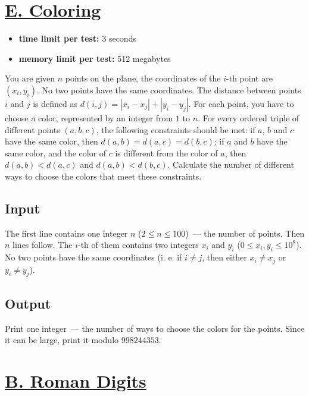 \documentclass{article}
\begin{document}
\section{\href{https://codeforces.com/problemset/problem/1697/E}{E. Coloring}}

\begin{itemize}
\item \textbf{time limit per test:}  3 seconds
\item \textbf{memory limit per test:}  512 megabytes
\end{itemize}
You are given $n$ points on the plane, the coordinates of the $i$-th point are $(x_i, y_i)$. No two points have the same coordinates. The distance between points $i$ and $j$ is defined as $d(i,j) = |x_i - x_j| + |y_i - y_j|$. For each point, you have to choose a color, represented by an integer from $1$ to $n$. For every ordered triple of different points $(a,b,c)$, the following constraints should be met: if $a$, $b$ and $c$ have the same color, then $d(a,b) = d(a,c) = d(b,c)$; if $a$ and $b$ have the same color, and the color of $c$ is different from the color of $a$, then $d(a,b) < d(a,c)$ and $d(a,b) < d(b,c)$. Calculate the number of different ways to choose the colors that meet these constraints.

\subsection*{Input}
 The first line contains one integer $n$ ($2 \le n \le 100$) — the number of points. Then $n$ lines follow. The $i$-th of them contains two integers $x_i$ and $y_i$ ($0 \le x_i, y_i \le 10^8$). No two points have the same coordinates (i. e. if $i \ne j$, then either $x_i \ne x_j$ or $y_i \ne y_j$).

\subsection*{Output}
 Print one integer — the number of ways to choose the colors for the points. Since it can be large, print it modulo $998244353$.

\section{\href{https://codeforces.com/problemset/problem/997/B}{B. Roman Digits}}
\end{document}
